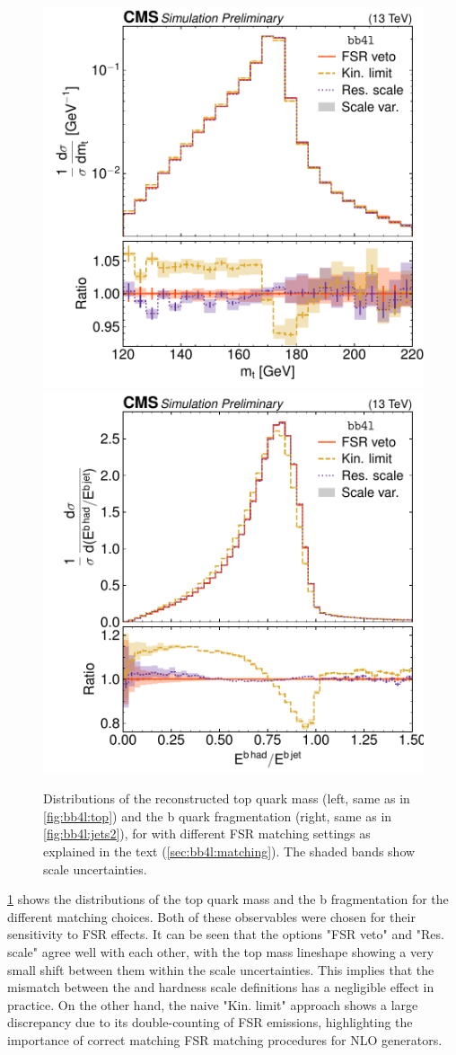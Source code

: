 \begin{figure}[tp]
    \centering
    \includegraphics[width=0.49 \textwidth]{figures/bb4l/matching/ADDED_top_mass.pdf}
    \hfill
    \includegraphics[width=0.49 \textwidth]{figures/bb4l/matching/MC_HFJETS_efracB.pdf}
    \caption{Distributions of the reconstructed top quark mass (left, same as in \cref{fig:bb4l:top}) and the b quark fragmentation (right, same as in \cref{fig:bb4l:jets2}), for \bbfourl with different FSR matching settings as explained in the text (\cref{sec:bb4l:matching}). The shaded bands show scale uncertainties.}
    \label{fig:bb4l:matching}
\end{figure}

\cref{fig:bb4l:matching} shows the distributions of the top quark mass and the b fragmentation for the different matching choices. Both of these observables were chosen for their sensitivity to FSR effects. It can be seen that the options "FSR veto" and "Res. scale" agree well with each other, with the top mass lineshape showing a very small shift between them within the scale uncertainties. This implies that the mismatch between the \powheg and \pythia hardness scale definitions has a negligible effect in practice. On the other hand, the naive "Kin. limit" approach shows a large discrepancy due to its double-counting of FSR emissions, highlighting the importance of correct matching FSR matching procedures for NLO generators.

